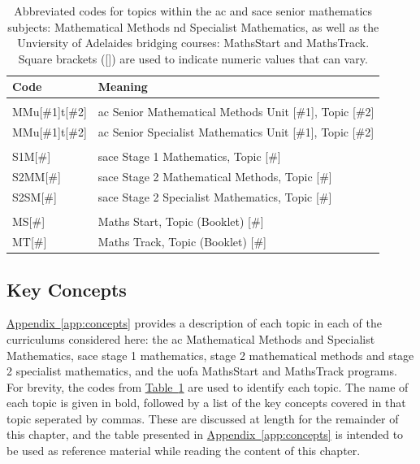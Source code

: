 \documentclass[twoside,12pt,a4paper]{report}
\newcommand{\reftab}[1]{\hyperref[tab:#1]{Table~\ref{tab:#1}}}
\newcommand{\refapp}[1]{\hyperref[app:#1]{Appendix~\ref{app:#1}}}
\begin{document}
\begin{table}[h]
\caption{Abbreviated codes for topics within the \gls{ac} and \gls{sace} senior mathematics subjects: Mathematical Methods nd Specialist Mathematics, as well as the Unviersity of Adelaides bridging courses: MathsStart and MathsTrack. Square brackets ([]) are used to indicate numeric values that can vary. \label{tab:notation}}
\begin{tabular}{ll}
Code & Meaning \\ \hline
 & \\
MMu[\#1]t[\#2] & \gls{ac} Senior Mathematical Methods Unit [\#1], Topic [\#2] \\
MMu[\#1]t[\#2] & \gls{ac} Senior Specialist Mathematics Unit [\#1], Topic [\#2] \\
 & \\
S1M[\#] & \gls{sace} Stage 1 Mathematics, Topic [\#] \\
S2MM[\#] & \gls{sace} Stage 2 Mathematical Methods, Topic [\#] \\
S2SM[\#] & \gls{sace} Stage 2 Specialist Mathematics, Topic [\#] \\
 & \\
MS[\#] & Maths Start, Topic (Booklet) [\#] \\
MT[\#] & Maths Track, Topic (Booklet) [\#]
\end{tabular}
\end{table}

\subsection{Key Concepts}

\refapp{concepts} provides a description of each topic in each of the curriculums considered here: the \gls{ac} Mathematical Methods and Specialist Mathematics, \gls{sace} stage 1 mathematics, stage 2 mathematical methods and stage 2 specialist mathematics, and the \gls{uofa} MathsStart and MathsTrack programs. For brevity, the codes from \reftab{notation} are used to identify each topic. The name of each topic is given in bold, followed by a list of the key concepts covered in that topic seperated by commas. These are discussed at length for the remainder of this chapter, and the table presented in \refapp{concepts} is intended to be used as reference material while reading the content of this chapter.
\end{document}
